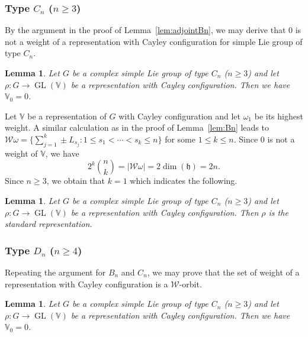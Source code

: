 \documentclass[11pt,reqno]{amsart}
\DeclareMathOperator{\GL}{GL}
\newtheorem{lemma}[theorem]{Lemma}
\newcommand{\W}{\mathcal{W}}
\begin{document}
\subsubsection{Type $C_n$ ($n \ge 3$)}    
By the argument in the proof of Lemma~\ref{lem:adjointBn},  we may derive that $0$ is not a weight of a representation with Cayley configuration for simple Lie group of type $C_n$.
\begin{lemma}\label{lem:adjointCn}
Let $G$ be a complex simple Lie group of type $C_n$ ($n\ge 3$) and let $\rho: G \to \GL(\mathbb{V})$ be a representation with Cayley configuration.  Then we have $\mathbb{V}_0 = 0$.   
\end{lemma}
Let $\mathbb{V}$ be a representation of $G$ with Cayley configuration and let $\omega_1$ be its highest weight.  A similar calculation as in the proof of Lemma~\ref{lem:Bn} leads to $\W \omega = \{ \sum_{j=1}^k \pm L_{s_j}: 1 \le s_1 < \cdots < s_k  \le n\}$ for some $1 \le k \le n$.  Since $0$ is not a weight of $\mathbb{V}$,  we have 
\[
2^k \binom{n}{k} = |\W \omega| = 2\dim (\mathfrak{h}) = 2n.
\]
Since $n \ge 3$,  we obtain that $k = 1$ which indicates the following.
\begin{lemma}\label{lem:C_n}
Let $G$ be a complex simple Lie group of type $C_n$ ($n\ge 3$) and let $\rho: G \to \GL(\mathbb{V})$ be a representation with Cayley configuration.  Then $\rho$ is the standard representation. 
\end{lemma}
\subsubsection{Type $D_n$ ($n \ge 4$)} Repeating the argument for $B_n$ and $C_n$,  we may prove that the set of weight of a representation with Cayley configuration is a $\W$-orbit.
\begin{lemma}
\label{lem:adjointDn}
Let $G$ be a  complex simple Lie group of type $C_n$ ($n\ge 3$) and let $\rho: G \to \GL(\mathbb{V})$ be a representation with Cayley configuration.  Then we have $\mathbb{V}_0 = 0$.   
\end{lemma}
\end{document}
